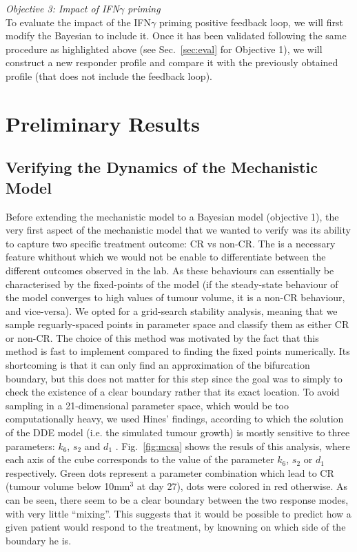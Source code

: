 \documentclass[11pt]{article}
\begin{document}
\textit{Objective 3: Impact of IFN$\gamma$ priming}\\[3pt]
To evaluate the impact of the IFN$\gamma$ priming positive feedback loop, we will first modify the Bayesian to include it. Once it has been validated following the same procedure as highlighted above (see Sec.~\ref{sec:eval} for Objective 1), we will construct a new responder profile and compare it with the previously obtained profile (that does not include the feedback loop).

\section{Preliminary Results}

\subsection{Verifying the Dynamics of the Mechanistic Model}\label{sec:montecarloSA}

Before extending the mechanistic model to a Bayesian model (objective 1), the very first aspect of the mechanistic model that we wanted to verify was its ability to capture two specific treatment outcome: CR vs non-CR. The is a necessary feature whithout which we would not be enable to differentiate between the different outcomes observed in the lab. As these behaviours can essentially be characterised by the fixed-points of the model (if the steady-state behaviour of the model converges to high values of tumour volume, it is a non-CR behaviour, and vice-versa). We opted for a grid-search stability analysis, meaning that we sample reguarly-spaced points in parameter space and classify them as either CR or non-CR. The choice of this method was motivated by the fact that this method is fast to implement compared to finding the fixed points numerically. Its shortcoming is that it can only find an approximation of the bifurcation boundary, but this does not matter for this step since the goal was to simply to check the existence of a clear boundary rather that its exact location. To avoid sampling in a 21-dimensional parameter space, which would be too computationally heavy, we used Hines' findings, according to which the solution of the DDE model (i.e. the simulated tumour growth) is mostly sensitive to three parameters: $k_6$, $s_2$ and $d_1$ \cite{christian1}. Fig.~\ref{fig:mcsa} shows the resuls of this analysis, where each axis of the cube corresponds to the value of the parameter $k_6$, $s_2$ or $d_1$ respectively. Green dots represent a parameter combination which lead to CR (tumour volume below 10mm$^3$ at day 27), dots were colored in red otherwise. As can be seen, there seem to be a clear boundary between the two response modes, with very little ``mixing''. This suggests that it would be possible to predict how a given patient would respond to the treatment, by knowning on which side of the boundary he is.
\end{document}
